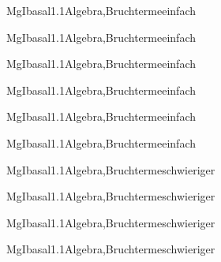 \documentclass[12pt]{article}
\begin{document}
    \begin{Add}{MgI}{basal1.1}{Algebra,Bruchterme}{einfach}
    \solution{ }
    \end{Add}
    \begin{Add}{MgI}{basal1.1}{Algebra,Bruchterme}{einfach}
    \end{Add}
    

    \begin{Add}{MgI}{basal1.1}{Algebra,Bruchterme}{einfach}
    \solution{ }
    \end{Add}
    \begin{Add}{MgI}{basal1.1}{Algebra,Bruchterme}{einfach}
    \end{Add}
    

    \begin{Add}{MgI}{basal1.1}{Algebra,Bruchterme}{einfach}
    \solution{ }
    \end{Add}
    \begin{Add}{MgI}{basal1.1}{Algebra,Bruchterme}{einfach}
    \end{Add}
    

    \begin{Add}{MgI}{basal1.1}{Algebra,Bruchterme}{schwieriger}
    \solution{ }
    \end{Add}
    \begin{Add}{MgI}{basal1.1}{Algebra,Bruchterme}{schwieriger}
    \end{Add}
    

    \begin{Add}{MgI}{basal1.1}{Algebra,Bruchterme}{schwieriger}
    \solution{ }
    \end{Add}
    \begin{Add}{MgI}{basal1.1}{Algebra,Bruchterme}{schwieriger}
    \end{Add}
    
\end{document}
